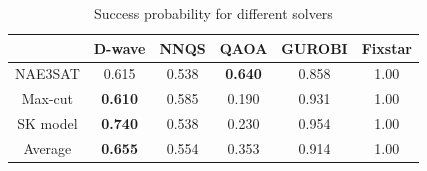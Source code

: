 \begin{table}[!ht]
    \centering
    \begin{tabular}{cccccc} \toprule
        ~ & D-wave & NNQS & QAOA & GUROBI & Fixstar \\ \midrule
        NAE3SAT & 0.615 & 0.538 & \textbf{0.640} & 0.858 & 1.00 \\
        Max-cut & \textbf{0.610} & 0.585 & 0.190 & 0.931 & 1.00 \\
        SK model & \textbf{0.740} & 0.538 & 0.230 & 0.954 & 1.00 \\ \midrule
        Average & \textbf{0.655} & 0.554 & 0.353 & 0.914 & 1.00 \\ \bottomrule
    \end{tabular}
\caption{Success probability for different solvers}
\label{results:allsuccess}
\end{table}

